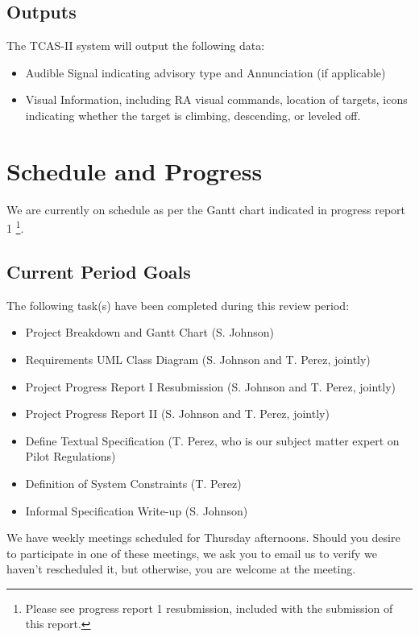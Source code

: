\documentclass[conference]{IEEEtran}
\begin{document}
\subsection{Outputs}
The TCAS-II system will output the following data:

\begin{itemize}
    \item Audible Signal indicating advisory type and Annunciation (if applicable)
    \item Visual Information, including RA visual commands, location of targets, icons indicating whether the target is climbing, descending, or leveled off.
\end{itemize}

\section{Schedule and Progress}
We are currently on schedule as per the Gantt chart indicated in progress report 1 \footnote{Please see progress report 1 resubmission, included with the submission of this report.}.

\subsection{Current Period Goals}
The following task(s) have been completed during this review period:
\begin{itemize}
    \item Project Breakdown and Gantt Chart (S. Johnson)
    \item Requirements UML Class Diagram (S. Johnson and T. Perez, jointly)
    \item Project Progress Report I Resubmission (S. Johnson and T. Perez, jointly)
    \item Project Progress Report II (S. Johnson and T. Perez, jointly)
    \item Define Textual Specification (T. Perez, who is our subject matter expert on Pilot Regulations)
    \item Definition of System Constraints (T. Perez)
    \item Informal Specification Write-up (S. Johnson)
\end{itemize}

We have weekly meetings scheduled for Thursday afternoons. Should you desire to participate in one of these meetings, we ask you to email us to verify we haven't rescheduled it, but otherwise, you are welcome at the meeting.
\end{document}
